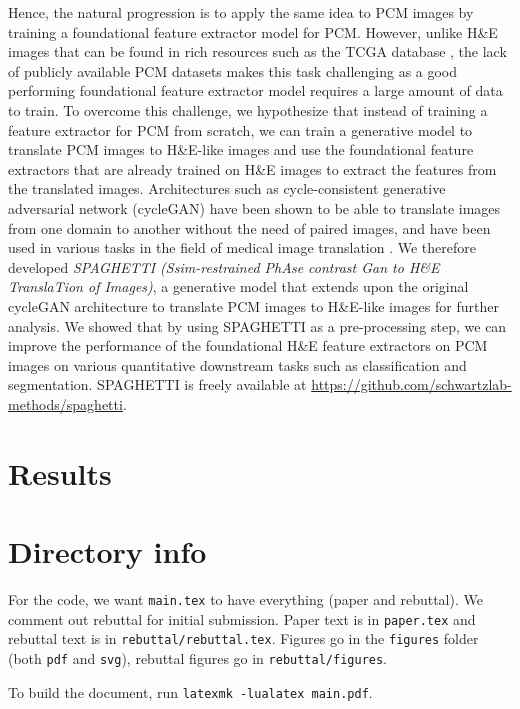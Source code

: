 \begin{refsegment}
Hence, the natural progression is to apply the same idea to PCM images by training a foundational feature extractor model for PCM. However, unlike H\&E images that can be found in rich resources such as the TCGA database \autocite{tcga}, the lack of publicly available PCM datasets makes this task challenging as a good performing foundational feature extractor model requires a large amount of data to train. To overcome this challenge, we hypothesize that instead of training a feature extractor for PCM from scratch, we can train a generative model to translate PCM images to H\&E-like images and use the foundational feature extractors that are already trained on H\&E images to extract the features from the translated images. Architectures such as cycle-consistent generative adversarial network (cycleGAN) \autocite{cyclegan2017} have been shown to be able to translate images from one domain to another without the need of paired images, and have been used in various tasks in the field of medical image translation \autocite{cyclegan_he,cyclegan_he_2}. We therefore developed \textit{SPAGHETTI (Ssim-restrained PhAse contrast Gan to H\&E TranslaTion of Images)}, a generative model that extends upon the original cycleGAN architecture to translate PCM images to H\&E-like images for further analysis. We showed that by using SPAGHETTI as a pre-processing step, we can improve the performance of the foundational H\&E feature extractors on PCM images on various quantitative downstream tasks such as classification and segmentation. SPAGHETTI is freely available at \url{https://github.com/schwartzlab-methods/spaghetti}.

\section*{Results}

\section*{Directory info}

For the code, we want \texttt{main.tex} to have everything (paper and rebuttal).
We comment out rebuttal for initial submission. Paper text is in
\texttt{paper.tex} and rebuttal text is in \texttt{rebuttal/rebuttal.tex}.
Figures go in the \texttt{figures} folder (both \texttt{pdf} and \texttt{svg}),
rebuttal figures go in \texttt{rebuttal/figures}.

To build the document, run \texttt{latexmk -lualatex main.pdf}.


\end{refsegment}
